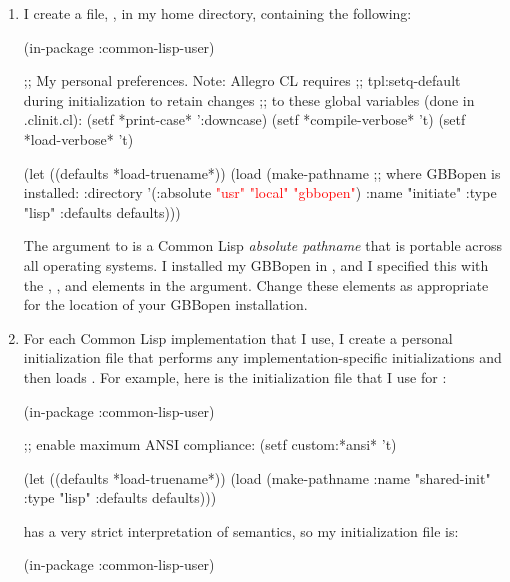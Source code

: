 \documentclass[10pt,twoside,english,pdftex]{article}
\begin{document}
\begin{enumerate}

\item I create a file, , in my home directory,
containing the following:
%
\W\supp\notpretop
\begin{example}
  (in-package :common-lisp-user)

  ;; My personal preferences.  Note: Allegro CL requires 
  ;; tpl:setq-default during initialization to retain changes
  ;; to these global variables (done in .clinit.cl):
  (setf *print-case* ':downcase)
  (setf *compile-verbose* 't)
  (setf *load-verbose* 't)

  (let ((defaults *load-truename*))
    (load (make-pathname 
            ;; where GBBopen is installed:
            :directory '(:absolute \textcolor{red}{"usr" "local" "gbbopen"})
            :name "initiate"
            :type "lisp"
            :defaults defaults)))
\end{example}

The  argument to  is a Common Lisp
\textit{absolute pathname} that is portable across all operating systems.  I
installed my GBBopen in , and I specified this with
the , , and  elements in the
 argument.  Change these elements as appropriate for the
location of your GBBopen installation.

\item For each Common Lisp implementation that I use, I create a personal
  initialization file that performs any implementation-specific
  initializations and then loads .  For example, here
  is the  initialization file that I use for
  :
%
\W\supp\notpretop
\begin{example}
  (in-package :common-lisp-user)

  ;; enable maximum ANSI compliance:
  (setf custom:*ansi* 't)

  (let ((defaults *load-truename*))
    (load (make-pathname 
            :name "shared-init"
            :type "lisp"
            :defaults defaults)))
\end{example}

 has a very strict interpretation
of  semantics, so my  initialization file
is:
%
\W\supp
\begin{example}
  (in-package :common-lisp-user)


\end{example}
\end{enumerate}
\end{document}
